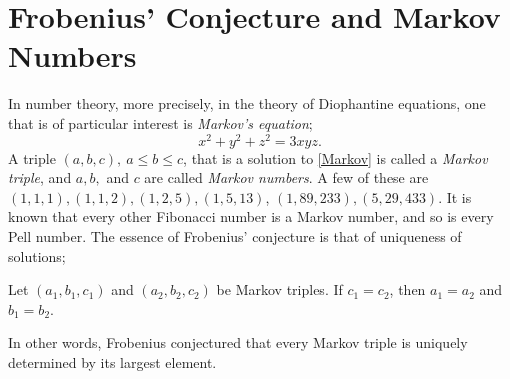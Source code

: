 \chapter{Frobenius' Conjecture and Markov Numbers}
In number theory, more precisely, in the theory of Diophantine equations, one that is of particular interest is \emph{Markov's equation};
\begin{equation}\label{Markov}
    x^2 + y^2 + z^2 = 3xyz.
\end{equation}
A triple $(a,b,c), \ a \leq b \leq c$, that is a solution to \ref{Markov} is called a \emph{Markov triple}, and $a,b,$ and $c$ are called \emph{Markov numbers}. A few of these are $(1,1,1),(1,1,2), (1,2,5), (1,5,13)$, $(1, 89, 233), (5, 29, 433)$. It is known that every other Fibonacci number is a Markov number, and so is every Pell number. The essence of Frobenius' conjecture is that of uniqueness of solutions;
\begin{conjecture}\label{frobconj}
    Let $(a_1,b_1,c_1)$ and $(a_2,b_2,c_2)$ be Markov triples. If $c_1 = c_2$, then $a_1 = a_2$ and $b_1 = b_2$. 
\end{conjecture}
In other words, Frobenius conjectured that every Markov triple is uniquely determined by its largest element. 
